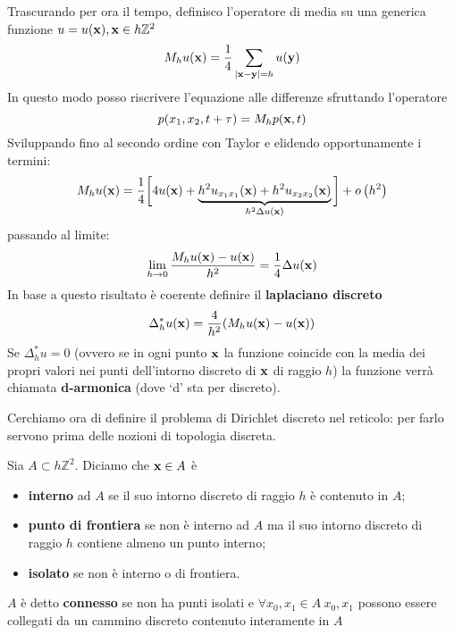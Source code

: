 Trascurando per ora il tempo, definisco l'operatore di media su una generica funzione $u=u(\mathbf{x}),\mathbf{x}\in h\mathbb{Z}^{2}$
\begin{equation*}
    M_{h} u(\mathbf{x}) =\frac{1}{4}\sum _{| \mathbf{x}-\mathbf{y}| =h} u(\mathbf{y})
\end{equation*}
In questo modo posso riscrivere l'equazione alle differenze sfruttando l'operatore
\begin{equation*}
    p(x_{1},x_{2},t+\tau) =M_{h} p(\mathbf{x},t)
\end{equation*}
Sviluppando fino al secondo ordine con Taylor e elidendo opportunamente i termini:
\begin{equation*}
    M_{h} u(\mathbf{x}) =\frac{1}{4}\bigg[4u(\mathbf{x}) +\underbrace{h^{2} u_{x_{1} x_{1}}(\mathbf{x}) +h^{2} u_{x_{2} x_{2}}(\mathbf{x})}_{h^{2} \Delta u(\mathbf{x})}\bigg] +o\left(h^{2}\right)
\end{equation*}
passando al limite:
\begin{equation*}
    \lim _{h\rightarrow 0}\frac{M_{h} u(\mathbf{x}) -u(\mathbf{x})}{h^{2}} =\frac{1}{4} \Delta u(\mathbf{x})
\end{equation*}
In base a questo risultato è coerente definire il \textbf{laplaciano discreto}
\begin{equation}
    \Delta ^{*}_{h} u(\mathbf{x}) =\frac{4}{h^{2}}(M_{h} u(\mathbf{x}) -u(\mathbf{x}))
\end{equation}
Se $\displaystyle \Delta ^{*}_{h} u=0$ (ovvero se in ogni punto $\mathbf{x}$ la funzione coincide con la media dei propri valori nei punti dell'intorno discreto di $\mathbf{x}$ di raggio $h$) la funzione verrà chiamata \textbf{d-armonica} (dove `d' sta per discreto).

Cerchiamo ora di definire il problema di Dirichlet discreto nel reticolo: per farlo servono prima delle nozioni di topologia discreta.

Sia $\displaystyle A \subset h\mathbb{Z}^{2}$. Diciamo che $\mathbf{x}\in A$ è
\begin{itemize}
    \item \textbf{interno} ad $A$ se il suo intorno discreto di raggio $h$ è contenuto in $A$;
    \item \textbf{punto di frontiera} se non è interno ad $A$ ma il suo intorno discreto di raggio $h$ contiene almeno un punto interno;
    \item \textbf{isolato} se non è interno o di frontiera.
\end{itemize}

$A$ è detto \textbf{connesso} se non ha punti isolati e $\displaystyle \forall x_{0},x_{1} \in A\ x_{0},x_{1}$ possono essere collegati da un cammino discreto contenuto interamente in $A$

